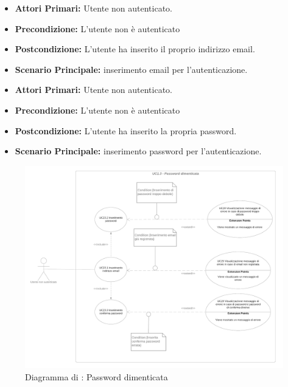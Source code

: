 \resetSubUC
{}
\begin{itemize}
	\item \textbf{Attori Primari:} Utente non autenticato.
	\item \textbf{Precondizione:} L'utente non è autenticato
	\item \textbf{Postcondizione:} L'utente ha inserito il proprio indirizzo email.
	\item \textbf{Scenario Principale:} inserimento email per l'autenticazione.
\end{itemize}


\begin{itemize}
	\item \textbf{Attori Primari:} Utente non autenticato.
	\item \textbf{Precondizione:} L'utente non è autenticato
	\item \textbf{Postcondizione:} L'utente ha inserito la propria password.
	\item \textbf{Scenario Principale:} inserimento password per l'autenticazione.
\end{itemize}


\begin{figure}[H]
    \centering
    \includegraphics[scale=0.2]{Immagini/DiagrammiUC/UC1.3PasswordDimenticata.png}
    \caption{Diagramma di \actualUC: Password dimenticata} 
    \label{fig:PasswordDimenticata}
\end{figure}

